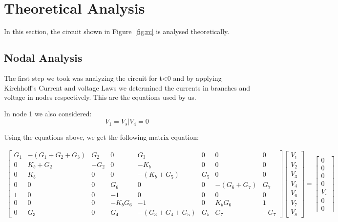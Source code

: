 \section{Theoretical Analysis}
\label{sec:analysis}

In this section, the circuit shown in Figure~\ref{fig:rc} is analysed
theoretically.

\subsection{Nodal Analysis}

The first step we took was analyzing the circuit for t<0 and by applying Kirchhoff's Current and voltage Laws we determined the currents in branches and voltage in nodes respectively. This are the equations used by us.

In node 1 we also considered:
\begin{equation}
	V_1 = V_s | V_4 = 0
\end{equation}


Using the equations above, we get the following matrix equation:

\begin{gather}
	\begin{bmatrix}
		G_1 & -(G_1 + G_2 + G_3) & G_2 & 0 & G_3 & 0 & 0 & 0 \\ 
		0 & K_b + G_2 & -G_2 & 0 & -K_b & 0 & 0 & 0 \\
		0 & K_b & 0 & 0 & -(K_b + G_5) & G_5 & 0 & 0 \\ 
		0 & 0 & 0 & G_6 & 0 & 0 & -(G_6 + G_7) & G_7 \\
		1 & 0 & 0 & -1 & 0 & 0 & 0 & 0 \\
		0 & 0 & 0 & -K_bG_6 & -1 & 0 & K_bG_6 & 1 \\
		0 & G_3 & 0 & G_4 & -(G_3 + G_4 + G_5) & G_5 & G_7 & -G_7
	\end{bmatrix}
	\begin{bmatrix} V_1 \\ V_2 \\ V_3 \\ V_4 \\ V_6 \\ V_7 \\ V_8 \end{bmatrix}
	=
	\begin{bmatrix} 0 \\ 0 \\ 0 \\ 0 \\ V_s \\ 0 \\ 0 \end{bmatrix}
\end{gather}

